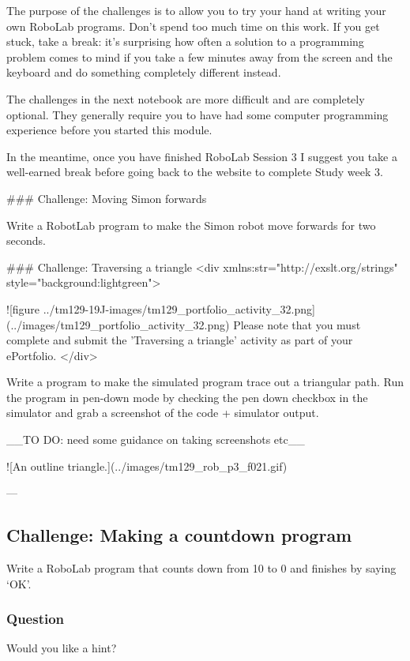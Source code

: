 \documentclass[letterpaper,10pt,english]{sphinxmanual}
\begin{document}
{The purpose of the challenges is to allow you to try your hand at writing your own RoboLab programs. Don’t spend too much time on this work. If you get stuck, take a break: it's surprising how often a solution to a programming problem comes to mind if you take a few minutes away from the screen and the keyboard and do something completely different instead.

The challenges in the next notebook are more difficult and are completely optional. They generally require you to have had some computer programming experience before you started this module.

In the meantime, once you have finished RoboLab Session 3 I suggest you take a well-earned break before going back to the website to complete Study week 3.


### Challenge: Moving Simon forwards

Write a RobotLab program to make the Simon robot move forwards for two seconds.


### Challenge: Traversing a triangle
<div xmlns:str="http://exslt.org/strings" style="background:lightgreen">

![figure ../tm129-19J-images/tm129_portfolio_activity_32.png](../images/tm129_portfolio_activity_32.png) Please note that you must complete and submit the 'Traversing a triangle' activity as part of your ePortfolio.
</div>

Write a program to make the simulated program trace out a triangular path. Run the program in pen-down mode by checking the pen down checkbox in the simulator and grab a screenshot of the code + simulator output.

__TO DO: need some guidance on taking screenshots etc__


![An outline triangle.](../images/tm129_rob_p3_f021.gif)


---


\subsection{Challenge: Making a countdown program}
\label{\detokenize{content/02_Robot_Lab/Section_00_03:Challenge:-Making-a-countdown-program}}\label{\detokenize{content/02_Robot_Lab/Section_00_03::doc}}
Write a RoboLab program that counts down from 10 to 0 and finishes by saying ‘OK’.


\subsubsection{Question}
\label{\detokenize{content/02_Robot_Lab/Section_00_03:Question}}
Would you like a hint?


}
\end{document}
